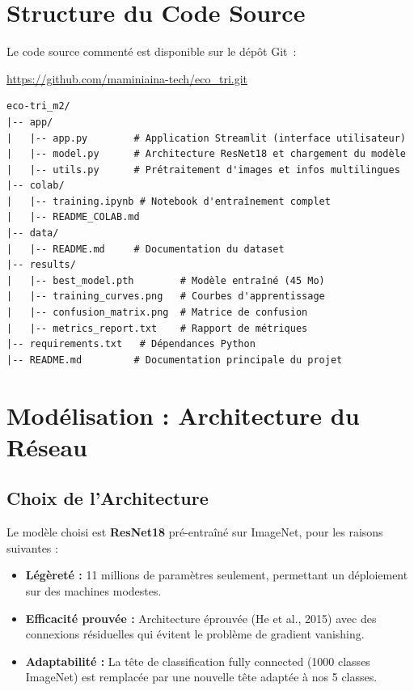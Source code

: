 \documentclass[12pt,a4paper]{report}
\begin{document}
\section{Structure du Code Source}
Le code source commenté est disponible sur le dépôt Git~:
\begin{center}
\url{https://github.com/maminiaina-tech/eco_tri.git}
\end{center}

\begin{verbatim}
eco-tri_m2/
|-- app/
|   |-- app.py        # Application Streamlit (interface utilisateur)
|   |-- model.py      # Architecture ResNet18 et chargement du modèle
|   |-- utils.py      # Prétraitement d'images et infos multilingues
|-- colab/
|   |-- training.ipynb # Notebook d'entraînement complet
|   |-- README_COLAB.md
|-- data/
|   |-- README.md     # Documentation du dataset
|-- results/
|   |-- best_model.pth        # Modèle entraîné (45 Mo)
|   |-- training_curves.png   # Courbes d'apprentissage
|   |-- confusion_matrix.png  # Matrice de confusion
|   |-- metrics_report.txt    # Rapport de métriques
|-- requirements.txt   # Dépendances Python
|-- README.md         # Documentation principale du projet
\end{verbatim}

\section{Modélisation : Architecture du Réseau}

\subsection{Choix de l'Architecture}
Le modèle choisi est \textbf{ResNet18} pré-entraîné sur ImageNet, pour les raisons suivantes :
\begin{itemize}
    \item \textbf{Légèreté :} 11 millions de paramètres seulement, permettant un déploiement sur des machines modestes.
    \item \textbf{Efficacité prouvée :} Architecture éprouvée (He et al., 2015) avec des connexions résiduelles qui évitent le problème de gradient vanishing.
    \item \textbf{Adaptabilité :} La tête de classification fully connected (1000 classes ImageNet) est remplacée par une nouvelle tête adaptée à nos 5 classes.
\end{itemize}
\end{document}
